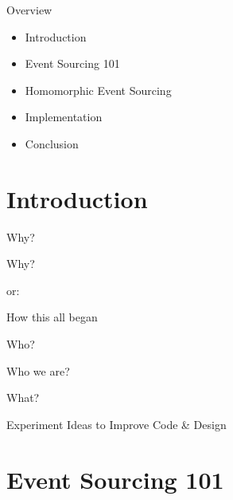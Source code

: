 \begin{frame}[fragile]{Overview}

\begin{itemize}
\item Introduction
\item Event Sourcing 101
\item Homomorphic Event Sourcing
\item Implementation
\item Conclusion
\end{itemize}

\end{frame}

\part{Introduction}

\begin{frame}[fragile]{Why?}

\begin{center}
{
\LARGE
Why?
}

\vspace{2em}

or:

\vspace{2em}

{
\Large
How this all began
}
\end{center}
\end{frame}


\begin{frame}[fragile]{Who?}

\begin{center}
{
\LARGE
Who we are?
}

\vspace{2em}
\end{center}
\end{frame}


\begin{frame}[fragile]{What?}

\begin{center}
{
\LARGE
Experiment Ideas to Improve Code \& Design
}

\vspace{2em}
\end{center}
\end{frame}

\part{Event Sourcing 101}


